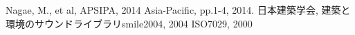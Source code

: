 \documentclass[10pt,twocolumn,uplatex,dvipdfmx]{jsarticle} %
\begin{document}

\begin{thebibliography}{9} %
\itemsep -5pt             %
 Nagae, M., et al, APSIPA, 2014 Asia-Pacific, pp.1-4, 2014.
 日本建築学会, 建築と環境のサウンドライブラリsmile2004, 2004
 ISO7029, 2000
\end{thebibliography}
\end{document}
